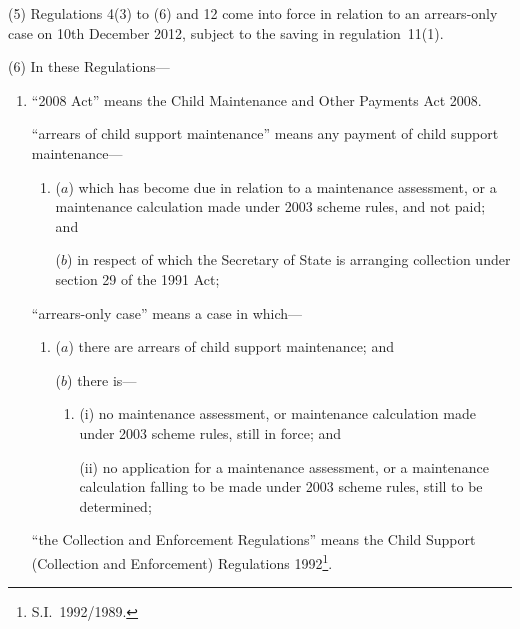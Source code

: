 \documentclass[12pt,a4paper]{article}
\begin{document}
(5) Regulations 4(3) to (6) and 12 come into force in relation to an arrears-only case on 10th December 2012, subject to the saving in regulation~11(1).

(6) In these Regulations—
\begin{enumerate}\item[]
“2008 Act” means the Child Maintenance and Other Payments Act 2008.

%

“arrears of child support maintenance” means any payment of child support maintenance—
\begin{enumerate}\item[]
($a$) 
which has become due in relation to a maintenance assessment, or a maintenance calculation made under 2003 scheme rules, and not paid; and

($b$) 
in respect of which the Secretary of State is arranging collection under section 29 of the 1991 Act;
\end{enumerate}

“arrears-only case” means a case in which—
\begin{enumerate}\item[]
($a$) 
there are arrears of child support maintenance; and

($b$) 
there is—
\begin{enumerate}\item[]
(i) 
no maintenance assessment, or maintenance calculation made under 2003 scheme rules, still in force; and

(ii) 
no application for a maintenance assessment, or a maintenance calculation falling to be made under 2003 scheme rules, still to be determined;
\end{enumerate}
\end{enumerate}

“the Collection and Enforcement Regulations” means the Child Support (Collection and Enforcement) Regulations 1992\footnote{S.I.~1992/1989.}.
\end{enumerate}
\end{document}
